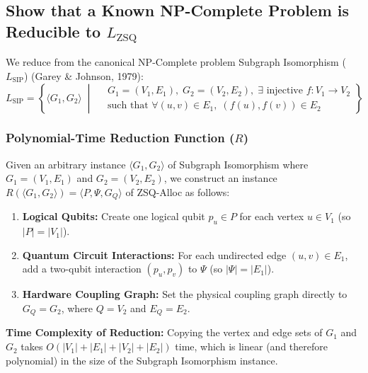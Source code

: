 \documentclass[11pt, a4paper]{article}
\begin{document}
\subsection{Show that a Known NP-Complete Problem is Reducible to \texorpdfstring{$L_{\text{ZSQ}}$}{LZSQ}}

We reduce from the canonical NP-Complete problem Subgraph Isomorphism ($L_{\text{SIP}}$) (Garey \& Johnson, 1979):
\[
L_{\text{SIP}} = \left\{ \langle G_1, G_2 \rangle \;\middle|\;
\begin{aligned}
    &G_1 = (V_1, E_1),\; G_2 = (V_2, E_2),\; \exists \text{ injective } f: V_1 \to V_2 \\
    &\text{such that } \forall (u, v) \in E_1,\; (f(u), f(v)) \in E_2
\end{aligned}
\right\}
\]

\subsubsection*{Polynomial-Time Reduction Function ($R$)}
Given an arbitrary instance $\langle G_1, G_2 \rangle$ of Subgraph Isomorphism where $G_1 = (V_1, E_1)$ and $G_2 = (V_2, E_2)$, we construct an instance $R(\langle G_1, G_2 \rangle) = \langle P, \Psi, G_Q \rangle$ of ZSQ-Alloc as follows:
\begin{enumerate}
    \item \textbf{Logical Qubits:} Create one logical qubit $p_u \in P$ for each vertex $u \in V_1$ (so $|P| = |V_1|$).
    \item \textbf{Quantum Circuit Interactions:} For each undirected edge $(u, v) \in E_1$, add a two-qubit interaction $(p_u, p_v)$ to $\Psi$ (so $|\Psi| = |E_1|$).
    \item \textbf{Hardware Coupling Graph:} Set the physical coupling graph directly to $G_Q = G_2$, where $Q = V_2$ and $E_Q = E_2$.
\end{enumerate}

\noindent\textbf{Time Complexity of Reduction:} Copying the vertex and edge sets of $G_1$ and $G_2$ takes $O(|V_1| + |E_1| + |V_2| + |E_2|)$ time, which is linear (and therefore polynomial) in the size of the Subgraph Isomorphism instance.
\end{document}
